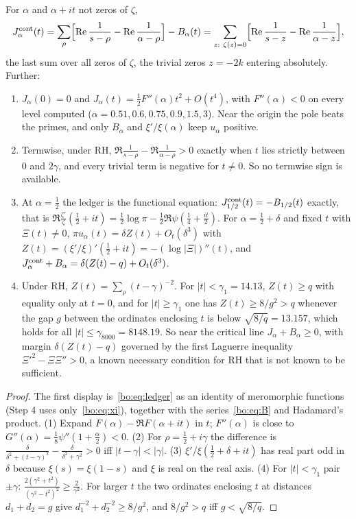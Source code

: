 \begin{proposition}\label{bo:prop:zeroside}
For $\alpha$ and $\alpha+it$ not zeros of $\zeta$,
\[
J^{\rm cont}_\alpha(t)=\sum_\rho\Bigl[\Re\frac1{s-\rho}-\Re\frac1{\alpha-\rho}\Bigr]-B_\alpha(t)=\sum_{z:\ \zeta(z)=0}\Bigl[\Re\frac1{s-z}-\Re\frac1{\alpha-z}\Bigr],
\]
the last sum over all zeros of $\zeta$, the trivial zeros $z=-2k$ entering absolutely. Further:
\begin{enumerate}
\item $J_\alpha(0)=0$ and $J_\alpha(t)=\frac12F''(\alpha)t^2+O(t^4)$, with $F''(\alpha)<0$ on every level computed ($\alpha=0.51,0.6,0.75,0.9,1.5,3$). Near the origin the pole beats the primes, and only $B_\alpha$ and $\xi'/\xi(\alpha)$ keep $u_\alpha$ positive.
\item Termwise, under RH, $\Re\frac1{s-\rho}-\Re\frac1{\alpha-\rho}>0$ exactly when $t$ lies strictly between $0$ and $2\gamma$, and every trivial term is negative for $t\ne0$. So no termwise sign is available.
\item At $\alpha=\frac12$ the ledger is the functional equation: $J^{\rm cont}_{1/2}(t)=-B_{1/2}(t)$ exactly, that is $\Re\frac{\zeta'}{\zeta}(\frac12+it)=\frac12\log\pi-\frac12\Re\psi(\frac14+\frac{it}2)$. For $\alpha=\frac12+\delta$ and fixed $t$ with $\Xi(t)\ne0$, $\pi u_\alpha(t)=\delta Z(t)+O_t(\delta^3)$ with $Z(t)=(\xi'/\xi)'(\frac12+it)=-(\log|\Xi|)''(t)$, and $J^{\rm cont}_\alpha+B_\alpha=\delta(Z(t)-q)+O_t(\delta^3)$.
\item Under RH, $Z(t)=\sum_\rho(t-\gamma)^{-2}$. For $|t|<\gamma_1=14.13$, $Z(t)\ge q$ with equality only at $t=0$, and for $|t|\ge\gamma_1$ one has $Z(t)\ge8/g^2>q$ whenever the gap $g$ between the ordinates enclosing $t$ is below $\sqrt{8/q}=13.157$, which holds for all $|t|\le\gamma_{8000}=8148.19$. So near the critical line $J_\alpha+B_\alpha\ge0$, with margin $\delta(Z(t)-q)$ governed by the first Laguerre inequality $\Xi'^2-\Xi\Xi''>0$, a known necessary condition for RH that is not known to be sufficient.
\end{enumerate}
\end{proposition}

\begin{proof}
The first display is~\eqref{bo:eq:ledger} as an identity of meromorphic functions (Step 4 uses only~\eqref{bo:eq:xi}), together with the series~\eqref{bo:eq:B} and Hadamard's product. (1) Expand $F(\alpha)-\Re F(\alpha+it)$ in $t$; $F''(\alpha)$ is close to $G''(\alpha)=\frac18\psi''(1+\frac\alpha2)<0$. (2) For $\rho=\frac12+i\gamma$ the difference is $\frac{\delta}{\delta^2+(t-\gamma)^2}-\frac{\delta}{\delta^2+\gamma^2}>0$ iff $|t-\gamma|<|\gamma|$. (3) $\xi'/\xi(\frac12+\delta+it)$ has real part odd in $\delta$ because $\xi(s)=\xi(1-s)$ and $\xi$ is real on the real axis. (4) For $|t|<\gamma_1$ pair $\pm\gamma$: $\frac{2(\gamma^2+t^2)}{(\gamma^2-t^2)^2}\ge\frac2{\gamma^2}$. For larger $t$ the two ordinates enclosing $t$ at distances $d_1+d_2=g$ give $d_1^{-2}+d_2^{-2}\ge8/g^2$, and $8/g^2>q$ iff $g<\sqrt{8/q}$.
\end{proof}

